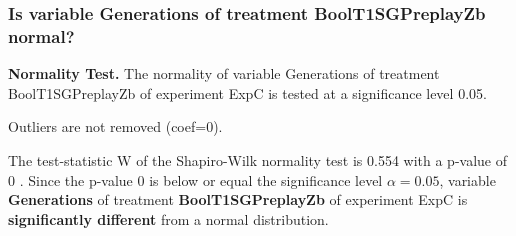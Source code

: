 \begin{frame}[t]
 \frametitle{Is variable Generations of treatment BoolT1SGPreplayZb normal?}
 {\bf Normality Test.} The normality of variable Generations of treatment BoolT1SGPreplayZb of experiment ExpC is tested at a significance level 0.05.

 Outliers are not removed (coef=0).
 
 The test-statistic W of the Shapiro-Wilk normality test is 0.554 with a p-value of 0 .
 Since the p-value 0 is below or equal the significance level $\alpha= 0.05 $,
 variable {\bf  Generations } of treatment {\bf  BoolT1SGPreplayZb } of experiment ExpC  is {\bf significantly different} from a normal distribution.

 \end{frame}
